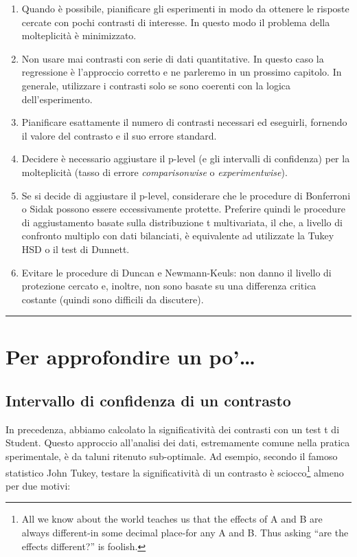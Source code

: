 \documentclass[a4paper,12pt,oneside]{book}
\providecommand{\tightlist}{%
  \setlength{\itemsep}{0pt}\setlength{\parskip}{0pt}}
\begin{document}
\begin{enumerate}
\def\labelenumi{\arabic{enumi}.}
\tightlist
\item
  Quando è possibile, pianificare gli esperimenti in modo da ottenere le risposte cercate con pochi contrasti di interesse. In questo modo il problema della molteplicità è minimizzato.
\item
  Non usare mai contrasti con serie di dati quantitative. In questo caso la regressione è l'approccio corretto e ne parleremo in un prossimo capitolo. In generale, utilizzare i contrasti solo se sono coerenti con la logica dell'esperimento.
\item
  Pianificare esattamente il numero di contrasti necessari ed eseguirli, fornendo il valore del contrasto e il suo errore standard.
\item
  Decidere è necessario aggiustare il p-level (e gli intervalli di confidenza) per la molteplicità (tasso di errore \emph{comparisonwise} o \emph{experimentwise}).
\item
  Se si decide di aggiustare il p-level, considerare che le procedure di Bonferroni o Sidak possono essere eccessivamente protette. Preferire quindi le procedure di aggiustamento basate sulla distribuzione t multivariata, il che, a livello di confronto multiplo con dati bilanciati, è equivalente ad utilizzate la Tukey HSD o il test di Dunnett.
\item
  Evitare le procedure di Duncan e Newmann-Keuls: non danno il livello di protezione cercato e, inoltre, non sono basate su una differenza critica costante (quindi sono difficili da discutere).
\end{enumerate}

\begin{center}\rule{0.5\linewidth}{\linethickness}\end{center}

\hypertarget{per-approfondire-un-po-7}{%
\section{Per approfondire un po'\ldots{}}\label{per-approfondire-un-po-7}}

\hypertarget{intervallo-di-confidenza-di-un-contrasto}{%
\subsection{Intervallo di confidenza di un contrasto}\label{intervallo-di-confidenza-di-un-contrasto}}

In precedenza, abbiamo calcolato la significatività dei contrasti con un test t di Student. Questo approccio all'analisi dei dati, estremamente comune nella pratica sperimentale, è da taluni ritenuto sub-optimale. Ad esempio, secondo il famoso statistico John Tukey, testare la significatività di un contrasto è sciocco\footnote{All we know about the world teaches us that the effects of A and B are always different-in some decimal place-for any A and B. Thus asking ``are the effects different?'' is foolish.} almeno per due motivi:
\end{document}
